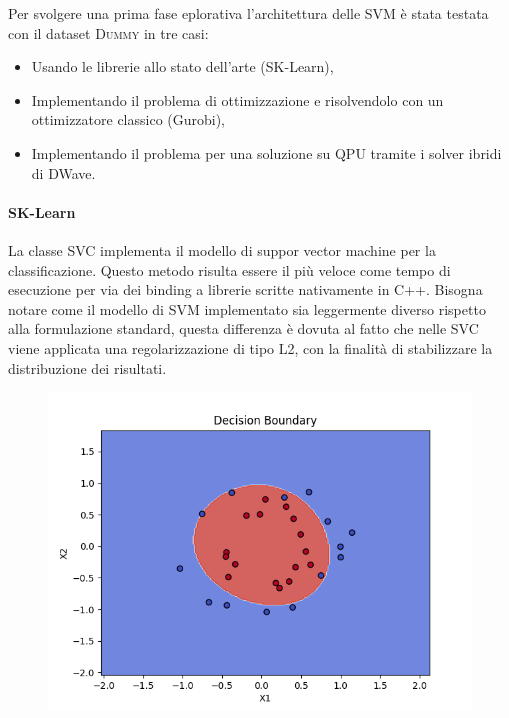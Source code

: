 \documentclass[12pt]{article}
\begin{document}
Per svolgere una prima fase eplorativa l'architettura delle SVM è stata testata con il dataset \textsc{Dummy} in tre casi:
\begin{itemize}
  \item Usando le librerie allo stato dell'arte (SK-Learn),
  \item Implementando il problema di ottimizzazione e risolvendolo con un ottimizzatore classico (Gurobi),
  \item Implementando il problema per una soluzione su QPU tramite i solver ibridi di DWave.
\end{itemize}

\paragraph{SK-Learn} La classe SVC implementa il modello di suppor vector machine per la classificazione.
Questo metodo risulta essere il più veloce come tempo di esecuzione per via dei binding a librerie scritte nativamente in \textsc{C++}.
Bisogna notare come il modello di SVM implementato sia leggermente diverso rispetto alla formulazione standard, 
questa differenza è dovuta al fatto che nelle SVC viene applicata una regolarizzazione di tipo L2,
con la finalità di stabilizzare la distribuzione dei risultati.

\begin{figure}[H]
  \centering
  \includegraphics[width=\linewidth]{img/decision_boundary_sklearn.png}
\end{figure}
\end{document}
